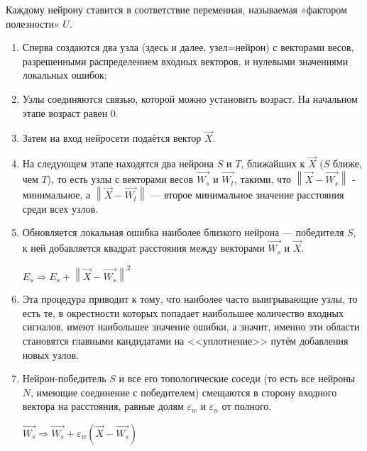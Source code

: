 \documentclass[unicode, 12pt, a4paper,oneside,fleqn]{article}
\begin{document}
Каждому нейрону ставится в соответствие переменная, называемая
«фактором полезности» $U$.
\begin{enumerate}
\item %
  Сперва создаются два узла (здесь и далее, узел=нейрон) с
  векторами весов, разрешенными распределением входных векторов, и
  нулевыми значениями локальных ошибок;

\item %
  Узлы соединяются связью, которой можно установить возраст. На
  начальном этапе возраст равен 0.

\item %
  Затем на вход нейросети подаётся вектор $\vec{X}$.

\item %
  На следующем этапе находятся два нейрона $S$ и $T$, ближайших к
  $\vec{X}$ ($S$ ближе, чем $T$), то есть узлы с векторами весов
  $\vec{W_s}$ и $\vec{W_t}$, такими, что
  $\left\|\vec{X}-\vec{W_s}\right\|$ - минимальное, а
  $\left\|\vec{X}-\vec{W_t}\right\|$ — второе минимальное значение
  расстояния среди всех узлов.

\item %
  Обновляется локальная ошибка наиболее близкого нейрона —
  победителя $S$, к ней добавляется квадрат расстояния между векторами
  $\vec{W_s}$ и $\vec{X}$.
  
  $E_{s}\Rightarrow E_{s} + \left\|\vec{X}-\vec{W_s}\right\|^{2}$

\item %
  Эта процедура приводит к тому, что наиболее часто выигрывающие
  узлы, то есть те, в окрестности которых попадает наибольшее
  количество входных сигналов, имеют наибольшее значение ошибки, а
  значит, именно эти области становятся главными кандидатами на
  <<уплотнение>> путём добавления новых узлов.

\item %
  Нейрон-победитель $S$ и все его топологические соседи (то есть
  все нейроны $N$, имеющие соединение с победителем) смещаются в
  сторону входного вектора на расстояния, равные долям
  $\varepsilon _w$ и $\varepsilon _n$ от полного.

  $\vec{W_s}\Rightarrow \vec{W_s}+\varepsilon_w(\vec{X}-\vec{W_s})$


\end{enumerate}
\end{document}
